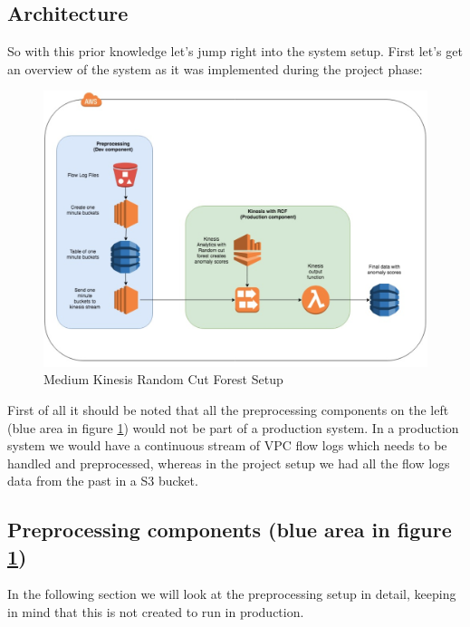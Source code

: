     \subsection{Architecture}
    So with this prior knowledge let’s jump right into the system setup.
    First let’s get an overview of the system as it was implemented during the project phase:
    \begin{figure}
        \centering
        \includegraphics[width=1\textwidth]{images/medium-kinesis-setup.png}
        \caption{Medium Kinesis Random Cut Forest Setup}
        \label{fig:medium_kinesis_setup}
    \end{figure}
    \FloatBarrier
    First of all it should be noted that all the preprocessing components on the left (blue area in figure \ref{fig:medium_kinesis_setup}) would not be part of a production system. In a production system we would have a continuous stream of VPC flow logs which needs to be handled and preprocessed, whereas in the project setup we had all the flow logs data from the past in a S3 bucket. 
    
    \subsection{Preprocessing components (blue area in figure \ref{fig:medium_kinesis_setup})}
    In the following section we will look at the preprocessing setup in detail, keeping in mind that this is not created to run in production.
    
